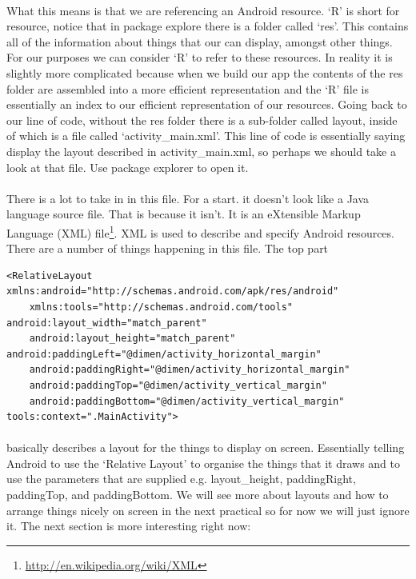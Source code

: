 \documentclass[12pt, a4paper, twoside]{book}
\begin{document}
\paragraph{} What this means is that we are referencing an Android resource. `R' is short for resource, notice that in package explore there is a folder called `res'. This contains all of the information about things that our can display, amongst other things. For our purposes we can consider `R' to refer to these resources. In reality it is slightly more complicated because when we build our app the contents of the res folder are assembled into a more efficient representation and the `R' file is essentially an index to our efficient representation of our resources. Going back to our line of code, without the res folder there is a sub-folder called layout, inside of which is a file called `activity\_main.xml'. This line of code is essentially saying display the layout described in activity\_main.xml, so perhaps we should take a look at that file. Use package explorer to open it.

\paragraph{} There is a lot to take in in this file. For a start. it doesn't look like a Java language source file. That is because it isn't. It is an eXtensible Markup Language (XML) file\footnote{\url{http://en.wikipedia.org/wiki/XML}}. XML is used to describe and specify Android resources. There are a number of things happening in this file. The top part

\begin{lstlisting}<RelativeLayout xmlns:android="http://schemas.android.com/apk/res/android"
    xmlns:tools="http://schemas.android.com/tools" android:layout_width="match_parent"
    android:layout_height="match_parent" android:paddingLeft="@dimen/activity_horizontal_margin"
    android:paddingRight="@dimen/activity_horizontal_margin"
    android:paddingTop="@dimen/activity_vertical_margin"
    android:paddingBottom="@dimen/activity_vertical_margin" tools:context=".MainActivity">
\end{lstlisting}

\paragraph{} basically describes a layout for the things to display on screen. Essentially telling Android to use the `Relative Layout' to organise the things that it draws and to use the parameters that are supplied e.g. layout\_height, paddingRight, paddingTop, and paddingBottom. We will see more about layouts and how to arrange things nicely on screen in the next practical so for now we will just ignore it. The next section is more interesting right now:
\end{document}
